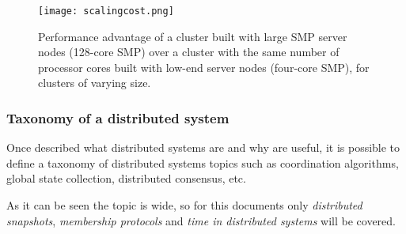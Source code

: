 \begin{figure}[!h]
\begin{center}
\texttt{[image: scalingcost.png]}
\caption{Performance advantage of a cluster built with large SMP server nodes
  (128-core SMP) over a cluster with the same number of processor cores built
  with low-end server nodes (four-core SMP), for clusters of varying
  size.\cite{Datacenter}}
\label{fig:highend}
\end{center}
\end{figure}

\subsubsection{Taxonomy of a distributed system}

Once described what distributed systems are and why are useful, it is possible
to define a taxonomy of distributed systems topics such as coordination
algorithms, global state collection, distributed consensus, etc.

As it can be seen the topic is wide, so for this documents only
\textit{distributed snapshots}, \textit{membership protocols} and \textit{time
  in distributed systems} will be covered.

